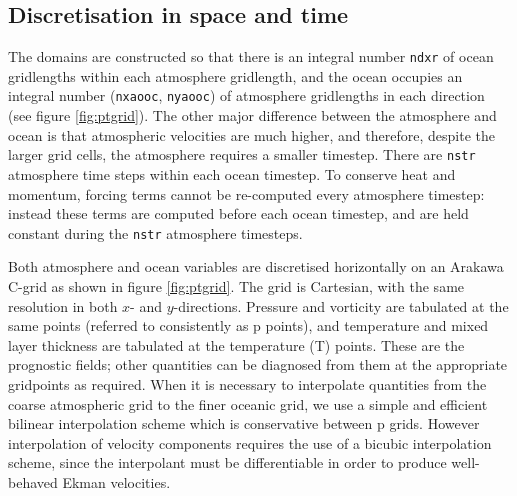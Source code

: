\documentclass[11pt, a4paper,twoside]{article}
\numberwithin{equation}{section}
\begin{document}
\subsection{Discretisation in space and time}

The domains are constructed so that there is an integral number \verb=ndxr= of ocean gridlengths within each atmosphere gridlength, and the ocean occupies an integral number (\verb=nxaooc=, \verb=nyaooc=) of atmosphere gridlengths in each direction (see figure \ref{fig:ptgrid}).
The other major difference between the atmosphere and ocean is that atmospheric velocities are much higher, and therefore, despite the larger grid cells, the atmosphere requires a smaller timestep.
There are \verb=nstr= atmosphere time steps within each ocean timestep.
To conserve heat and momentum, forcing terms cannot be re-computed every atmosphere timestep: instead these terms are computed before each ocean timestep, and are held constant during the \verb=nstr= atmosphere timesteps.

Both atmosphere and ocean variables are discretised horizontally on an Arakawa C-grid \citep{arakawa:77} as shown in figure \ref{fig:ptgrid}.
The grid is Cartesian, with the same resolution in both $x$- and $y$-directions.
Pressure and vorticity are tabulated at the same points (referred to consistently as p points), and temperature and mixed layer thickness are tabulated at the temperature (T) points.
These are the prognostic fields; other quantities can be diagnosed from them at the appropriate gridpoints as required.
When it is necessary to interpolate quantities from the coarse atmospheric grid to the finer oceanic grid, we use a simple and efficient bilinear interpolation scheme which is conservative between p grids.
However interpolation of velocity components requires the use of a bicubic interpolation scheme, since the interpolant must be differentiable in order to produce well-behaved Ekman velocities.
\end{document}
